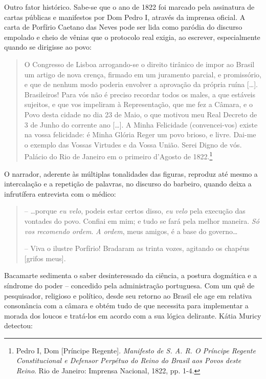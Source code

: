 Outro fator histórico. Sabe-se que o ano de 1822 foi marcado pela
assinatura de cartas públicas e manifestos por Dom Pedro I, através da
imprensa oficial. A carta de Porfírio Caetano das Neves pode ser lida
como paródia do discurso empolado e cheio de vênias que o protocolo real
exigia, ao escrever, especialmente quando se dirigisse ao povo:

\begin{quote}
O Congresso de Lisboa arrogando-se o direito tirânico de impor ao Brasil
um artigo de nova crença, firmado em um juramento parcial, e
promissório, e que de nenhum modo poderia envolver a aprovação da
própria ruína {[}\ldots{}{]}. Brasileiros! Para vós não é preciso
recordar todos os males, a que estáveis sujeitos, e que vos impeliram à
Representação, que me fez a Câmara, e o Povo desta cidade no dia 23 de
Maio, o que motivou meu Real Decreto de 3 de Junho do corrente ano
{[}\ldots{}{]}. A Minha Felicidade (convencei-vos) existe na vossa
felicidade: é Minha Glória Reger um povo brioso, e livre. Dai-me o
exemplo das Vossas Virtudes e da Vossa União. Serei Digno de vós.
Palácio do Rio de Janeiro em o primeiro d'Agosto de 1822.\footnote{Pedro
  I, Dom {[}Príncipe Regente{]}. \emph{Manifesto de S. A. R. O Príncipe
  Regente Constitucional e Defensor Perpétuo do Reino do Brasil aos
  Povos deste Reino}. Rio de Janeiro: Imprensa Nacional, 1822, pp. 1-4.}
\end{quote}

O narrador, aderente às múltiplas tonalidades das figuras, reproduz até
mesmo a intercalação e a repetição de palavras, no discurso do barbeiro,
quando deixa a infrutífera entrevista com o médico:

\begin{quote}
-- \ldots{}porque \emph{eu velo}, podeis estar certos disso, \emph{eu
velo} pela execução das vontades do povo. Confiai em mim; e tudo se fará
pela melhor maneira. \emph{Só vos recomendo ordem}. \emph{A ordem}, meus
amigos, é a base do governo\ldots{}

-- Viva o ilustre Porfírio! Bradaram as trinta vozes, agitando os
chapéus {[}grifos meus{]}.
\end{quote}

Bacamarte sedimenta o saber desinteressado da ciência, a postura
dogmática e a síndrome do poder -- concedido pela administração
portuguesa. Com um quê de pesquisador, religioso e político, desde seu
retorno ao Brasil ele age em relativa consonância com a câmara e obtém
tudo de que necessita para implementar a morada dos loucos e tratá-los
em acordo com a sua lógica delirante. Kátia Muricy detectou:

